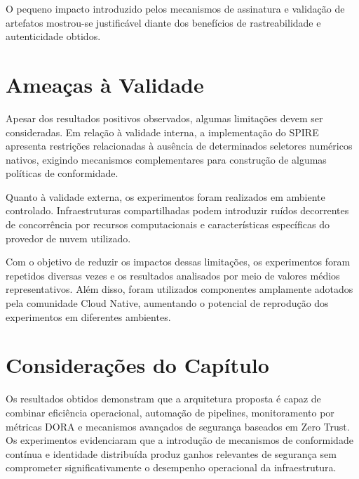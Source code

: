 O pequeno impacto introduzido pelos mecanismos de assinatura e validação de artefatos mostrou-se justificável diante dos benefícios de rastreabilidade e autenticidade obtidos.

\section{Ameaças à Validade}
\label{sec:ameacas-validade}

Apesar dos resultados positivos observados, algumas limitações devem ser consideradas. Em relação à validade interna, a implementação do SPIRE apresenta restrições relacionadas à ausência de determinados seletores numéricos nativos, exigindo mecanismos complementares para construção de algumas políticas de conformidade.

Quanto à validade externa, os experimentos foram realizados em ambiente controlado. Infraestruturas compartilhadas podem introduzir ruídos decorrentes de concorrência por recursos computacionais e características específicas do provedor de nuvem utilizado.

Com o objetivo de reduzir os impactos dessas limitações, os experimentos foram repetidos diversas vezes e os resultados analisados por meio de valores médios representativos. Além disso, foram utilizados componentes amplamente adotados pela comunidade Cloud Native, aumentando o potencial de reprodução dos experimentos em diferentes ambientes.

\section{Considerações do Capítulo}
\label{sec:consideracoes-resultados}

Os resultados obtidos demonstram que a arquitetura proposta é capaz de combinar eficiência operacional, automação de pipelines, monitoramento por métricas DORA e mecanismos avançados de segurança baseados em Zero Trust. Os experimentos evidenciaram que a introdução de mecanismos de conformidade contínua e identidade distribuída produz ganhos relevantes de segurança sem comprometer significativamente o desempenho operacional da infraestrutura.
